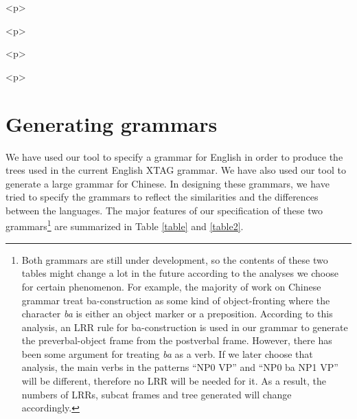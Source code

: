  
\begin{rawhtml} <p> \end{rawhtml}
\centerline{} 
\begin{rawhtml} <dl> <dt>{Interface for creating a grammar <p> </dl> \end{rawhtml}
\label{interface-firstlevel} 
\begin{rawhtml} <p> \end{rawhtml}
 
 
\begin{rawhtml} <p> \end{rawhtml}
\centerline{} 
\vspace{0.4in} 
\begin{rawhtml} <dl> <dt>{Part of the Interface for creating blocks <p> </dl> \end{rawhtml}
\label{interface-block} 
\begin{rawhtml} <p> \end{rawhtml}
 
 
\section{Generating grammars} 
 
We have used our tool to specify a grammar for English in order to produce 
the trees used in the current English XTAG grammar. 
We have also used our tool 
to generate a large grammar for Chinese. 
In designing these 
grammars, we have tried to specify the grammars to reflect the similarities and 
the differences between the languages. The major features of our specification 
of these two grammars\footnote{Both grammars are still under development, so the contents of these two tables might change a lot in the future according to the analyses we choose for certain phenomenon. For example, the majority of work on Chinese grammar treat ba-construction as some kind of object-fronting where the character {\it ba} is either an object marker or a preposition. According to this analysis, an LRR rule for ba-construction is used in our grammar to generate the preverbal-object frame from the postverbal frame. However, there has been some argument for treating {\it ba} as a verb. If we later choose that analysis, the main verbs in the patterns ``NP0 VP'' and ``NP0 ba NP1 VP'' will be different, therefore no LRR will be needed for it. As a result, the numbers of LRRs, subcat frames and tree generated will change accordingly.} 
 are summarized in Table \ref{table} and \ref{table2}. 
 
